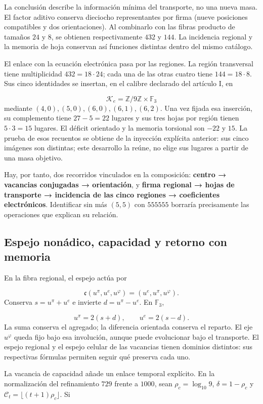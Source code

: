 La conclusión describe la información mínima del transporte, no una
nueva masa. El factor aditivo conserva dieciocho representantes por firma
(nueve posiciones compatibles y dos orientaciones). Al combinarlo con las
fibras producto de tamaños \(24\) y \(8\), se obtienen respectivamente
\(432\) y \(144\). La incidencia regional y la memoria de hoja conservan
así funciones distintas dentro del mismo catálogo.



El enlace con la ecuación electrónica pasa por las regiones. La región transversal tiene multiplicidad \(432=18\cdot24\); cada una de las otras cuatro tiene \(144=18\cdot8\). Sus cinco identidades se insertan, en el calibre declarado del artículo I, en

\[
\mathcal K_e=\mathbb Z/9\mathbb Z\times\mathbb F_3
\]
mediante \((4,0),(5,0),(6,0),(6,1),(6,2)\). Una vez fijada esa inserción, su complemento tiene \(27-5=22\) lugares y sus tres hojas por región tienen \(5\cdot3=15\) lugares. El déficit orientado y la memoria torsional son \(-22\) y \(15\). La prueba de esos recuentos se obtiene de la inyección explícita anterior: sus cinco imágenes son distintas; este desarrollo la reúne, no elige sus lugares a partir de una masa objetivo.

Hay, por tanto, dos recorridos vinculados en la composición: \textbf{centro → vacancias conjugadas → orientación}, y \textbf{firma regional → hojas de transporte → incidencia de las cinco regiones → coeficientes electrónicos}. Identificar sin más \((5,5)\) con \(555555\) borraría precisamente las operaciones que explican su relación.

\subsection{Espejo nonádico, capacidad y retorno con memoria}
En la fibra regional, el espejo actúa por

\[
\mathfrak c(u^\pi,u^e,u^\varphi)=(u^e,u^\pi,u^\varphi).
\]
Conserva \(s=u^\pi+u^e\) e invierte \(d=u^\pi-u^e\). En \(\mathbb F_3\),

\[
u^\pi=2(s+d),\qquad u^e=2(s-d).
\]
La suma conserva el agregado; la diferencia orientada conserva el reparto. El eje \(u^\varphi\) queda fijo bajo esa involución, aunque puede evolucionar bajo el transporte. El espejo regional y el espejo celular de las vacancias tienen dominios distintos: sus respectivas fórmulas permiten seguir qué preserva cada uno.

La vacancia de capacidad añade un enlace temporal explícito. En la normalización del refinamiento \(729\) frente a \(1000\), sean \(\rho_c=\log_{10}9\), \(\delta=1-\rho_c\) y \(\mathcal C_t=\lfloor(t+1)\rho_c\rfloor\). Si

